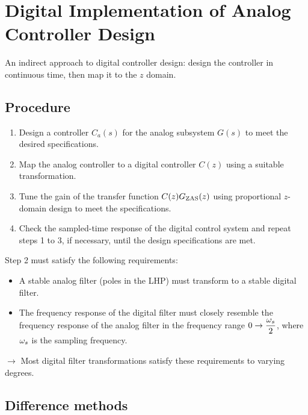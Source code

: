 \section{Digital Implementation of Analog Controller Design}\label{sec:implementation}


An indirect approach to digital controller design: design the controller in continuous time, then map it to
the $z$ domain.

\subsection{Procedure}
\begin{enumerate}
  \item[\textcircled{1}] Design a controller $C_a(s)$ for the analog subsystem $G(s)$ to meet the desired
        specifications.
  \item[\textcircled{2}] Map the analog controller to a digital controller $C(z)$ using a suitable transformation.
  \item[\textcircled{3}] Tune the gain of the transfer function $C(z)G_{\mathrm{ZAS}}(z)$ using proportional $z$-domain design to
        meet the specifications.
  \item[\textcircled{4}] Check the sampled-time response of the digital control system and repeat steps 1 to 3, if
        necessary, until the design specifications are met.
\end{enumerate}
Step 2 must satisfy the following requirements:
\begin{itemize}
  \item A stable analog filter (poles in the LHP) must transform to a stable digital filter.
  \item The frequency response of the digital filter must closely resemble the frequency response of the analog
        filter in the frequency range $0\to\dfrac{\omega_s}{2}$, where $\omega_s$ is the sampling frequency.
\end{itemize}
$\to$ Most digital filter transformations satisfy these requirements to varying degrees.

\subsection{Difference methods}
